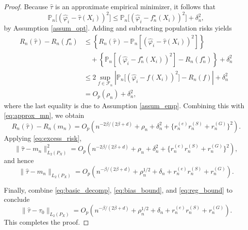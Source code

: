 \documentclass{article}
\newenvironment{proofof}[1]
{\renewcommand{\proofname}{Proof of #1}\begin{proof}}
{\end{proof}}
\begin{document}
\begin{proofof} {Theorem~\ref{thm:overall_rate_holder}:}
Because $\hat\tau$ is an approximate empirical minimizer, it follows that
\[
\mathbb P_n\big[(\hat\varphi_i-\hat\tau(X_i))^2\big]
\le
\mathbb P_n\big[(\hat\varphi_i-f_n^\star(X_i))^2\big]+\delta_n^2,
\]
by Assumption \ref{assum_opt}.
Adding and subtracting population risks yields
\begin{align*}
R_n(\hat\tau)-R_n(f_n^\star)
&\le
\left\{R_n(\hat\tau)-\mathbb P_n[(\hat\varphi_i-\hat\tau(X_i))^2]\right\}\\
&\quad+
\left\{\mathbb P_n[(\hat\varphi_i-f_n^\star(X_i))^2]-R_n(f_n^\star)\right\}
+\delta_n^2\\
&\le
2\sup_{f\in\mathcal F_n}
\left|
\mathbb P_n\big[(\hat\varphi_i-f(X_i))^2\big]-R_n(f)
\right|
+\delta_n^2\\
&=
O_p(\rho_n)+\delta_n^2,
\end{align*}
where the last equality is due to Assumption \ref{assum_emp}.
Combining this with \eqref{eq:approx_mn}, we obtain
\[
R_n(\hat\tau)-R_n(m_n)
=
O_p\!\left(
n^{-2\beta/(2\beta+d)}
+
\rho_n
+
\delta_n^2
+
\{r_n^{(e)}r_n^{(S)}+r_n^{(G)}\}^2
\right).
\]
Applying \eqref{eq:excess_risk},
\[
\|\hat\tau-m_n\|_{L_2(P_X)}^2
=
O_p\!\left(
n^{-2\beta/(2\beta+d)}
+
\rho_n
+
\delta_n^2
+
\{r_n^{(e)}r_n^{(S)}+r_n^{(G)}\}^2
\right),
\]
and hence
\begin{equation}\label{eq:reg_bound}
\|\hat\tau-m_n\|_{L_2(P_X)}
=
O_p\!\left(
n^{-\beta/(2\beta+d)}
+
\rho_n^{1/2}
+
\delta_n
+
r_n^{(e)}r_n^{(S)}
+
r_n^{(G)}
\right).
\end{equation}

Finally, combine \eqref{eq:basic_decomp}, \eqref{eq:bias_bound}, and \eqref{eq:reg_bound} to conclude
\[
\|\hat\tau-\tau_0\|_{L_2(P_X)}
=
O_p\!\left(
n^{-\beta/(2\beta+d)}
+
\rho_n^{1/2}
+
\delta_n
+
r_n^{(e)}r_n^{(S)}
+
r_n^{(G)}
\right).
\]
This completes the proof.
\end{proofof}
\end{document}
